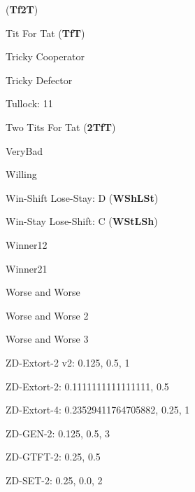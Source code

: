 (\textbf{Tf2T})\item Tit For Tat
(\textbf{TfT})\item Tricky Cooperator
\item Tricky Defector
\item Tullock: 11
\item Two Tits For Tat
(\textbf{2TfT})\item VeryBad
\item Willing
\item Win-Shift Lose-Stay: D
(\textbf{WShLSt})\item Win-Stay Lose-Shift: C
(\textbf{WStLSh})\item Winner12
\item Winner21
\item Worse and Worse
\item Worse and Worse 2
\item Worse and Worse 3
\item ZD-Extort-2 v2: 0.125, 0.5, 1
\item ZD-Extort-2: 0.1111111111111111, 0.5
\item ZD-Extort-4: 0.23529411764705882, 0.25, 1
\item ZD-GEN-2: 0.125, 0.5, 3
\item ZD-GTFT-2: 0.25, 0.5
\item ZD-SET-2: 0.25, 0.0, 2

